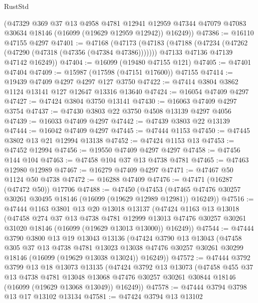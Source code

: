 \begin{lexlean}{RustStd}
\begin{coremodule}
      (@47329
        @369
        @37
        @13
        @4958
        @4781
        @12941
        @12959
        @47344
        @47079
        @47083
        @30634
        @18146
        (@16099 (@19629 @12959 @12942))
        @16249))
@47386 := @16110 @47155 @4297
@47401 := @47168
    (@47173
      (@47183
        (@47188 (@47234 (@47262 (@47290 (@47318 (@47356 (@47384 @47386)))))))
        @47133
        @47136
        @47139
        @47142
        @16249))
@47404 := @16099 (@19480 @47155 @121)
@47405 := @47401 @47404
@47409 := @15987 (@17598 (@47151 @17600)) @47155
@47414 := @19439 @47409 @4297 @4297 @127 @3750
@47422 := @47414 @3804 @3862 @1124 @13141 @127 @12647 @13316 @13640
@47424 := @16054 @47409 @4297
@47427 := @47424 @3804 @3750 @13141
@47430 := @16063 @47409 @4297 @3754
@47437 := @47430 @3803 @22 @3750 @4508 @13139 @4297 @4056
@47439 := @16033 @47409 @4297
@47442 := @47439 @3803 @22 @13139
@47444 := @16042 @47409 @4297
@47445 := @47444 @1153
@47450 := @47445 @3802 @13 @21 @12994 @13138
@47452 := @47424 @1153 @13
@47453 := @47452 @12994
@47456 := @19550 @47409 @4297 @4297
@47458 := @47456 @144 @104
@47463 := @47458 @104 @37 @13 @4738 @4781
@47465 := @47463 @12980 @12989
@47467 := @16279 @47409 @4297
@47471 := @47467 @50 @1124 @50 @4738
@47472 := @16288 @47409
@47476 := @47471 (@16287 (@47472 @50)) @17706
@47488 := @47450
    (@47453 (@47465 @47476 @30257 @30261 @30495 @18146 (@16099 (@19629 @12989 @12981)) @16249))
@47516 := @47444
    @1163
    @3801
    @13
    @20
    @13018
    @13137
    (@47424
      @1163
      @13
      @13018
      (@47458
        @274
        @37
        @13
        @4738
        @4781
        @12999
        @13013
        @47476
        @30257
        @30261
        @31020
        @18146
        (@16099 (@19629 @13013 @13000))
        @16249))
@47544 := @47444
    @3790
    @3800
    @13
    @19
    @13043
    @13136
    (@47424
      @3790
      @13
      @13043
      (@47458
        @305
        @37
        @13
        @4738
        @4781
        @13023
        @13038
        @47476
        @30257
        @30261
        @30299
        @18146
        (@16099 (@19629 @13038 @13024))
        @16249))
@47572 := @47444
    @3792
    @3799
    @13
    @18
    @13073
    @13135
    (@47424
      @3792
      @13
      @13073
      (@47458
        @455
        @37
        @13
        @4738
        @4781
        @13048
        @13068
        @47476
        @30257
        @30261
        @30844
        @18146
        (@16099 (@19629 @13068 @13049))
        @16249))
@47578 := @47444 @3794 @3798 @13 @17 @13102 @13134
@47581 := @47424 @3794 @13 @13102

\end{coremodule}
\end{lexlean}
